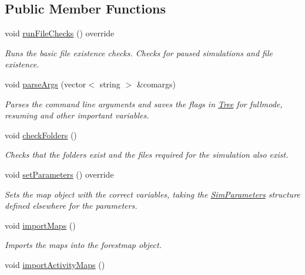 \subsection*{Public Member Functions}
\begin{DoxyCompactItemize}
\item 
void \hyperlink{class_spatial_tree_a060fb8be17d702ed5eb0c142a89d9773}{run\+File\+Checks} () override\hypertarget{class_spatial_tree_a060fb8be17d702ed5eb0c142a89d9773}{}\label{class_spatial_tree_a060fb8be17d702ed5eb0c142a89d9773}

\begin{DoxyCompactList}\small\item\em Runs the basic file existence checks. Checks for paused simulations and file existence. \end{DoxyCompactList}\item 
void \hyperlink{class_spatial_tree_ad6a5412bccbccc92a302b2fb05bbced2}{parse\+Args} (vector$<$ string $>$ \&comargs)
\begin{DoxyCompactList}\small\item\em Parses the command line arguments and saves the flags in \hyperlink{class_tree}{Tree} for fullmode, resuming and other important variables. \end{DoxyCompactList}\item 
void \hyperlink{class_spatial_tree_aef0097abc7c616ed656e26b4055834c3}{check\+Folders} ()\hypertarget{class_spatial_tree_aef0097abc7c616ed656e26b4055834c3}{}\label{class_spatial_tree_aef0097abc7c616ed656e26b4055834c3}

\begin{DoxyCompactList}\small\item\em Checks that the folders exist and the files required for the simulation also exist. \end{DoxyCompactList}\item 
void \hyperlink{class_spatial_tree_a0c83bcd9a84f4fa98c78b75a78a9a012}{set\+Parameters} () override
\begin{DoxyCompactList}\small\item\em Sets the map object with the correct variables, taking the \hyperlink{struct_sim_parameters}{Sim\+Parameters} structure defined elsewhere for the parameters. \end{DoxyCompactList}\item 
void \hyperlink{class_spatial_tree_ab9603c25cd1c8466d1e4bfa3f73f191f}{import\+Maps} ()
\begin{DoxyCompactList}\small\item\em Imports the maps into the forestmap object. \end{DoxyCompactList}\item 
void \hyperlink{class_spatial_tree_a8ba526e7129f70b4ccff289c1a21d2a9}{import\+Activity\+Maps} ()\hypertarget{class_spatial_tree_a8ba526e7129f70b4ccff289c1a21d2a9}{}\label{class_spatial_tree_a8ba526e7129f70b4ccff289c1a21d2a9}


\end{DoxyCompactItemize}
